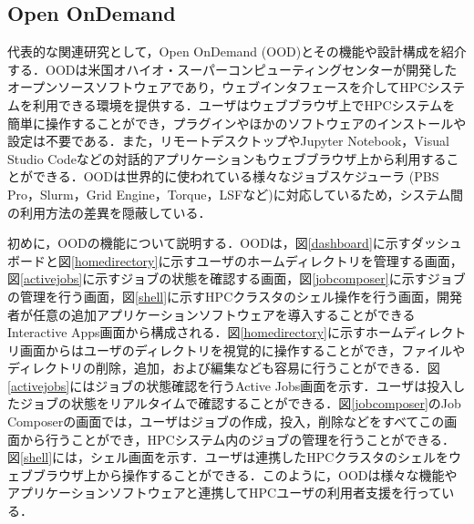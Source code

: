 \subsection{Open OnDemand}
代表的な関連研究として，Open OnDemand (OOD)とその機能や設計構成を紹介する\cite{cite2,cite3}．OODは米国オハイオ・スーパーコンピューティングセンターが開発したオープンソースソフトウェアであり，ウェブインタフェースを介してHPCシステムを利用できる環境を提供する．ユーザはウェブブラウザ上でHPCシステムを簡単に操作することができ，プラグインやほかのソフトウェアのインストールや設定は不要である．また，リモートデスクトップやJupyter Notebook\cite{jupyternotebook}，Visual Studio Codeなどの対話的アプリケーションもウェブブラウザ上から利用することができる．OODは世界的に使われている様々なジョブスケジューラ (PBS Pro\cite{PBS_Pro}，Slurm\cite{Slurm}，Grid Engine\cite{Grid_Engine}，Torque\cite{TORQUE}，LSF\cite{LSF}など)に対応しているため，システム間の利用方法の差異を隠蔽している．\par
初めに，OODの機能について説明する．OODは，図\ref{dashboard}に示すダッシュボードと図\ref{homedirectory}に示すユーザのホームディレクトリを管理する画面，図\ref{activejobs}に示すジョブの状態を確認する画面，図\ref{jobcomposer}に示すジョブの管理を行う画面，図\ref{shell}に示すHPCクラスタのシェル操作を行う画面，開発者が任意の追加アプリケーションソフトウェアを導入することができるInteractive Apps画面から構成される．図\ref{homedirectory}に示すホームディレクトリ画面からはユーザのディレクトリを視覚的に操作することができ，ファイルやディレクトリの削除，追加，および編集なども容易に行うことができる．図\ref{activejobs}にはジョブの状態確認を行うActive Jobs画面を示す．ユーザは投入したジョブの状態をリアルタイムで確認することができる．図\ref{jobcomposer}のJob Composerの画面では，ユーザはジョブの作成，投入，削除などをすべてこの画面から行うことができ，HPCシステム内のジョブの管理を行うことができる．図\ref{shell}には，シェル画面を示す．ユーザは連携したHPCクラスタのシェルをウェブブラウザ上から操作することができる．このように，OODは様々な機能やアプリケーションソフトウェアと連携してHPCユーザの利用者支援を行っている．\par
